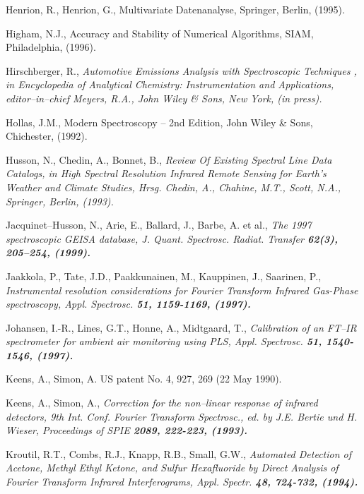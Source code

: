 \begin{thebibliography}{giese-bogdan,199797}
 Henrion, R., Henrion, G.,
Multivariate Datenanalyse, Springer, Berlin, (1995).

 Higham, N.J., Accuracy and
Stability of Numerical Algorithms, SIAM, Philadelphia, (1996).

 Hirschberger, R.,
\it Automotive Emissions Analysis with Spectroscopic Techniques\rm
, in Encyclopedia of Analytical Chemistry: Instrumentation and
Applications, editor--in--chief Meyers, R.A., John Wiley \& Sons,
New York, (in press).

 Hollas, J.M., Modern
Spectroscopy -- 2nd Edition, John Wiley \& Sons, Chichester,
(1992).

 Husson, N., Chedin, A., Bonnet,
B., \it Review Of Existing Spectral Line Data Catalogs\rm , in
High Spectral Resolution Infrared Remote Sensing for Earth's
Weather and Climate Studies, Hrsg. Chedin, A., Chahine, M.T.,
Scott, N.A., Springer, Berlin, (1993).

 Jacquinet--Husson, N., Arie, E.,
Ballard, J., Barbe, A. et al., \it The 1997 spectroscopic GEISA
database\rm, J. Quant. Spectrosc. Radiat. Transfer \bf 62(3)\rm,
205--254, (1999).

 Jaakkola, P., Tate, J.D., Paakkunainen,
M., Kauppinen, J., Saarinen, P., \it Instrumental resolution
considerations for Fourier Transform Infrared Gas-Phase
spectroscopy\rm , Appl. Spectrosc. \bf 51\rm , 1159-1169, (1997).

Johansen, I.-R., Lines, G.T., Honne, A.,
Midtgaard, T., \it Calibration of an FT--IR spectrometer for
ambient air monitoring using PLS\rm , Appl. Spectrosc. \bf 51\rm ,
1540-1546, (1997).

 Keens, A., Simon, A.
US patent No. 4, 927, 269 (22 May 1990).

 Keens, A., Simon, A.,
\it Correction for the non--linear response of infrared
detectors\rm , 9th Int. Conf. Fourier Transform Spectrosc., ed. by
J.E. Bertie und H. Wieser, Proceedings of SPIE \bf 2089\rm ,
222-223, (1993).

 Kroutil, R.T., Combs, R.J., Knapp, R.B., Small, G.W.,
\it Automated Detection of Acetone, Methyl Ethyl Ketone, and
Sulfur Hexafluoride by Direct Analysis of Fourier Transform
Infrared Interferograms\rm , Appl. Spectr. \bf 48\rm , 724-732,
(1994).


\end{thebibliography}
